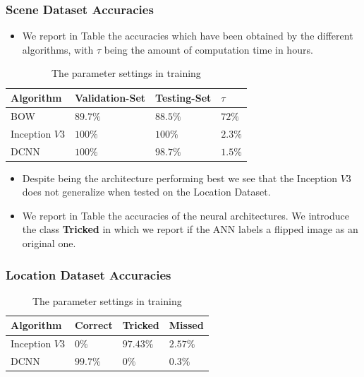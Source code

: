 \documentclass[a0, portrait]{IWIposter}
\begin{document}
\begin{multicols}{3}
\centering
\subsubsection*{Scene Dataset Accuracies}

\begin{itemize}
\item We report in Table the accuracies which have been obtained by the different algorithms, with $\tau$ being the amount of computation time in hours.
\end{itemize}

\begin{table}
\centering
\caption{The parameter settings in training}
\label{my-label}
\begin{tabular}{>{\rowmac}l|>{\rowmac}l|>{\rowmac}l|>{\rowmac}l<{\clearrow}}
\textbf{Algorithm}   & \textbf{Validation-Set} & \textbf{Testing-Set} & \textbf{$\tau$}  \\ \hline
        BOW                    & $89.7\%$             & $88.5\%$           & $72\%$    \\
        Inception $V3$         & $100\%$              & $100\%$            & $2.3\%$     \\
        DCNN                   & $100\%$              & $98.7\%$           & $1.5\%$          \\
\end{tabular}
\end{table}

\begin{itemize}
\item Despite being the architecture performing best we see that the Inception $V3$ does not generalize when tested on the Location Dataset.
\item We report in Table the accuracies of the neural architectures. We introduce the class \textbf{Tricked} in which we report if the ANN labels a flipped image as an original one.
\end{itemize}

\centering
\subsubsection*{Location Dataset Accuracies}

\begin{table}
\centering
\caption{The parameter settings in training}
\label{my-label}
\begin{tabular}{>{\rowmac}l|>{\rowmac}l|>{\rowmac}l|>{\rowmac}l<{\clearrow}}
\textbf{Algorithm}   & \textbf{Correct} & \textbf{Tricked} & \textbf{Missed}  \\ \hline
       Inception $V3$         & $0\%$              & $97.43\%$            & $2.57\%$     \\
       DCNN                   & $99.7\%$              & $0\%$           & $0.3\%$          \\
\end{tabular}
\end{table}


\end{multicols}
\end{document}
